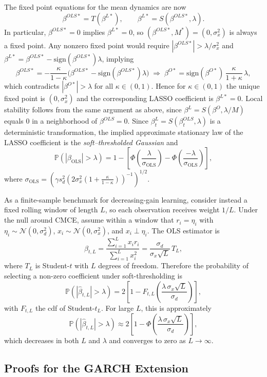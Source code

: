 The fixed point equations for the mean dynamics are now
\[
\beta^{OLS*}=T(\beta^{L*}),\qquad \beta^{L*}=S(\beta^{OLS*},\lambda).
\]
In particular, $\beta^{OLS*}=0$ implies $\beta^{L*}=0$, so $(\beta^{OLS*},M^*)=(0,\sigma_x^2)$ is always a fixed point. Any nonzero fixed point would require $|\beta^{OLS*}|>\lambda/\sigma_x^2$ and $\beta^{L*}=\beta^{OLS*}-\mathrm{sign}(\beta^{OLS*})\lambda$, implying
\[
\beta^{OLS*}=-\frac{\kappa}{1-\kappa}\Big(\beta^{OLS*}-\mathrm{sign}(\beta^{OLS*})\lambda\Big)
\;\Rightarrow\;
\beta^{O*}=\mathrm{sign}(\beta^{O*})\,\frac{\kappa}{1+\kappa}\,\lambda,
\]
which contradicts $|\beta^{O*}|>\lambda$ for all $\kappa\in(0,1)$. Hence for $\kappa\in(0,1)$ the unique fixed point is $(0,\sigma_x^2)$ and the corresponding LASSO coefficient is $\beta^{L*}=0$. 
Local stability follows from the same argument as above, since $\beta^{L}=S(\beta^{O},\lambda/M)$ equals $0$ in a neighborhood of $\beta^{OLS}=0$.
Since $\beta^L_t=S(\beta^{OLS}_t,\lambda)$ is a deterministic transformation, the implied approximate stationary law of the LASSO coefficient is the \emph{soft--thresholded Gaussian} and 
\[ \mathbb{P}(|{\beta}_{\text{OLS}}| > \lambda) = 1 - \left[\Phi\left(\frac{\lambda}{\sigma_{\text{OLS}}}\right) - \Phi\left(\frac{-\lambda}{\sigma_{\text{OLS}}}\right)\right], \]
where $\sigma_{\text{OLS}} = \left(\gamma s_{d}^2 \left(2 \sigma^2_x \left(1 + \frac{\kappa}{1 - \kappa} \right)\right)^{-1}\right)^{1/2}$.

As a finite-sample benchmark for decreasing-gain learning, consider instead a fixed rolling window of length $L$, so each observation receives weight $1/L$. Under the null around CMCE, assume within a window that $r_i=\eta_i$ with $\eta_i\sim \mathcal N(0,\sigma_d^2)$, $x_i\sim \mathcal N(0,\sigma_x^2)$, and $x_i\perp \eta_i$. The OLS estimator is
\[
\hat\beta_{t,L}=\frac{\sum_{i=1}^{L} x_i r_i}{\sum_{i=1}^{L} x_i^2}
=\frac{\sigma_d}{\sigma_x\sqrt{L}}\,T_L,
\]
where $T_L$ is Student-$t$ with $L$ degrees of freedom. Therefore the probability of selecting a non-zero coefficient under soft-thresholding is
\[
\mathbb P\!\left(|\hat\beta_{t,L}|>\lambda\right)
=2\left[1-F_{t,L}\!\left(\frac{\lambda\,\sigma_x\sqrt{L}}{\sigma_d}\right)\right],
\]
with $F_{t,L}$ the cdf of Student-$t_L$. For large $L$, this is approximately
\[
\mathbb P\!\left(|\hat\beta_{t,L}|>\lambda\right)
\approx 2\left[1-\Phi\!\left(\frac{\lambda\,\sigma_x\sqrt{L}}{\sigma_d}\right)\right],
\]
which decreases in both $L$ and $\lambda$ and converges to zero as $L\to\infty$.

\subsection{Proofs for the GARCH Extension}\label{app:proofs_GARCH}


